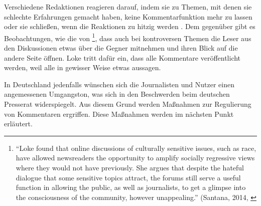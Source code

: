 Verschiedene Redaktionen reagieren darauf, indem sie zu Themen, mit denen sie
schlechte Erfahrungen gemacht haben, keine Kommentarfunktion mehr zu lassen oder
sie schließen, wenn die Reaktionen zu hitzig werden
\autocite[S.~4]{santana:2014}. Dem gegenüber gibt es Beobachtungen, wie die von
\textcite{loke}\footnote{``Loke found that online discussions of culturally
sensitive issues, such as race, have allowed newsreaders the opportunity to
amplify socially regressive views where they would not have previously. She
argues that despite the hateful dialogue that some sensitive topics attract, the
forums still serve a useful function in allowing the public, as well as
journalists, to get a glimpse into the consciousness of the community, however
unappealing.'' (Santana, 2014, \autocite[S.~12]{santana:2014}}, dass auch bei
kontroversen Themen die Leser aus den Diskussionen etwas über die Gegner
mitnehmen und ihren Blick auf die andere Seite öffnen. Loke tritt dafür ein,
dass alle Kommentare veröffentlicht werden, weil alle in gewisser Weise etwas
aussagen.

In Deutschland jedenfalls wünschen sich die Journalisten und Nutzer einen
angemessenen Umgangston, was sich in den Beschwerden beim deutschen Presserat
widerspiegelt. Aus diesem Grund werden Maßnahmen zur Regulierung von Kommentaren
ergriffen. Diese Maßnahmen werden im nächsten Punkt erläutert.

